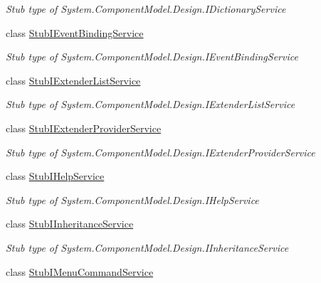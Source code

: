 \begin{DoxyCompactItemize}
\begin{DoxyCompactList}\small\item\em Stub type of System.\-Component\-Model.\-Design.\-I\-Dictionary\-Service\end{DoxyCompactList}\item 
class \hyperlink{class_system_1_1_component_model_1_1_design_1_1_fakes_1_1_stub_i_event_binding_service}{Stub\-I\-Event\-Binding\-Service}
\begin{DoxyCompactList}\small\item\em Stub type of System.\-Component\-Model.\-Design.\-I\-Event\-Binding\-Service\end{DoxyCompactList}\item 
class \hyperlink{class_system_1_1_component_model_1_1_design_1_1_fakes_1_1_stub_i_extender_list_service}{Stub\-I\-Extender\-List\-Service}
\begin{DoxyCompactList}\small\item\em Stub type of System.\-Component\-Model.\-Design.\-I\-Extender\-List\-Service\end{DoxyCompactList}\item 
class \hyperlink{class_system_1_1_component_model_1_1_design_1_1_fakes_1_1_stub_i_extender_provider_service}{Stub\-I\-Extender\-Provider\-Service}
\begin{DoxyCompactList}\small\item\em Stub type of System.\-Component\-Model.\-Design.\-I\-Extender\-Provider\-Service\end{DoxyCompactList}\item 
class \hyperlink{class_system_1_1_component_model_1_1_design_1_1_fakes_1_1_stub_i_help_service}{Stub\-I\-Help\-Service}
\begin{DoxyCompactList}\small\item\em Stub type of System.\-Component\-Model.\-Design.\-I\-Help\-Service\end{DoxyCompactList}\item 
class \hyperlink{class_system_1_1_component_model_1_1_design_1_1_fakes_1_1_stub_i_inheritance_service}{Stub\-I\-Inheritance\-Service}
\begin{DoxyCompactList}\small\item\em Stub type of System.\-Component\-Model.\-Design.\-I\-Inheritance\-Service\end{DoxyCompactList}\item 
class \hyperlink{class_system_1_1_component_model_1_1_design_1_1_fakes_1_1_stub_i_menu_command_service}{Stub\-I\-Menu\-Command\-Service}

\end{DoxyCompactItemize}
